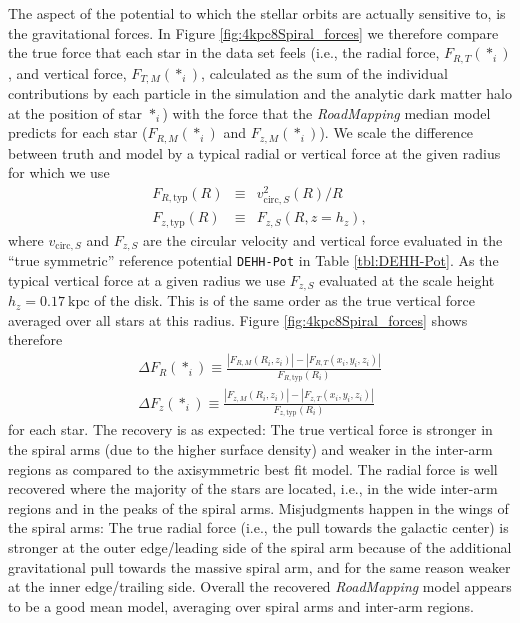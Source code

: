 \documentclass[iop,revtex4,numberedappendix,appendixfloats]{emulateapj}
\newcommand{\RM}{{\sl RoadMapping}}
\begin{document}
The aspect of the potential to which the stellar orbits are actually sensitive to, is the gravitational forces. In Figure \ref{fig:4kpc8Spiral_forces} we therefore compare the true force that each star in the data set feels (i.e., the radial force, $F_{R,T}(*_i)$, and vertical force, $F_{T,M}(*_i)$, calculated as the sum of the individual contributions by each particle in the simulation and the analytic dark matter halo at the position of star $*_i$) with the force that the \RM{} median model predicts for each star ($F_{R,M}(*_i)$ and $F_{z,M}(*_i)$). We scale the difference between truth and model by a typical radial or vertical force at the given radius for which we use
\begin{eqnarray}
F_{R,\text{typ}}(R) &\equiv& v^2_{\text{circ},S}(R) / R\\
F_{z,\text{typ}}(R) &\equiv& F_{z,S}(R,z=h_z),
\end{eqnarray}
where $v_{\text{circ},S}$ and $F_{z,S}$ are the circular velocity and vertical force evaluated in the ``true symmetric'' reference potential \texttt{DEHH-Pot} in Table \ref{tbl:DEHH-Pot}. As the typical vertical force at a given radius we use $F_{z,S}$ evaluated at the scale height $h_z=0.17~\text{kpc}$ of the disk. This is of the same order as the true vertical force averaged over all stars at this radius. Figure \ref{fig:4kpc8Spiral_forces} shows therefore
\begin{eqnarray}
\Delta F_R(*_i) \equiv \frac{|F_{R,M}(R_i,z_i)| - |F_{R,T}(x_i,y_i,z_i)|}{F_{R,\text{typ}}(R_i)}\label{eq:delta_FR}\\
\Delta F_z(*_i) \equiv \frac{|F_{z,M}(R_i,z_i)| - |F_{z,T}(x_i,y_i,z_i)|}{F_{z,\text{typ}}(R_i)}\label{eq:delta_Fz}
\end{eqnarray}
for each star. The recovery is as expected: The true vertical force is stronger in the spiral arms (due to the higher surface density) and weaker in the inter-arm regions as compared to the axisymmetric best fit model. The radial force is well recovered where the majority of the stars are located, i.e., in the wide inter-arm regions and in the peaks of the spiral arms. Misjudgments happen in the wings of the spiral arms: The true radial force (i.e., the pull towards the galactic center) is stronger at the outer edge/leading side of the spiral arm because of the additional gravitational pull towards the massive spiral arm, and for the same reason weaker at the inner edge/trailing side. Overall the recovered \RM{} model appears to be a good mean model, averaging over spiral arms and inter-arm regions.
\end{document}
